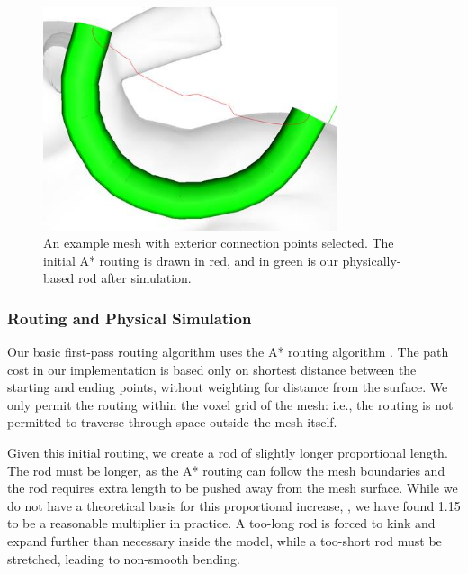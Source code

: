 \begin{figure}[h!]
\centering
    \includegraphics[width=3.4in]{figures/placeholder/exterior.jpg}
\caption{An example mesh with exterior connection points selected.  The initial A* routing is drawn in {\color{red}red}, and in {\color{tovi}green} is our physically-based rod after simulation.}
\label{fig:tool-process-exterior}
\end{figure}

\subsubsection{Routing and Physical Simulation}

Our basic first-pass routing algorithm uses the A* routing algorithm \cite{Hart-Astar}.  The path cost in our implementation is based only on shortest distance between the starting and ending points, without weighting for distance from the surface.  We only permit the routing within the voxel grid of the mesh: i.e., the routing is not permitted to traverse through space outside the mesh itself.

Given this initial routing, we create a rod of slightly longer proportional length.  The rod must be longer, as the A* routing can follow the mesh boundaries and the rod requires extra length to be pushed away from the mesh surface.  While we do not have a theoretical basis for this proportional increase, , we have found 1.15 to be a reasonable multiplier in practice.  A too-long rod is forced to kink and expand further than necessary inside the model, while a too-short rod must be stretched, leading to non-smooth bending.

